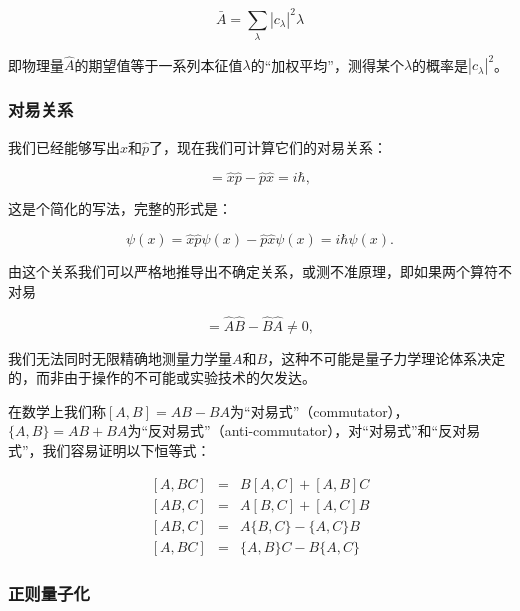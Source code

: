 \begin{equation}
\bar A = \sum\limits_{\lambda} |c_{\lambda}|^2 \lambda
\end{equation}

即物理量$\hat A$的期望值等于一系列本征值$\lambda$的“加权平均”，测得某个$\lambda$的概率是$|c_{\lambda}|^2$。

\subsubsection{对易关系}

我们已经能够写出$\hat x$和$\hat p$了，现在我们可计算它们的对易关系：

\begin{equation}
[\hat x, \hat p] = \hat x \hat p - \hat p \hat x = i \hbar,
\end{equation}

这是个简化的写法，完整的形式是：

\begin{equation}
[\hat x, \hat p]\psi(x) = \hat x \hat p \psi(x) - \hat p \hat x
\psi(x)= i \hbar \psi(x).
\end{equation}

由这个关系我们可以严格地推导出不确定关系，或测不准原理，即如果两个算符不对易

\begin{equation}
[\hat A, \hat B] =\hat A \hat B - \hat B \hat A  \neq 0 ,
\end{equation}

我们无法同时无限精确地测量力学量$A$和$B$，这种不可能是量子力学理论体系决定的，而非由于操作的不可能或实验技术的欠发达。

在数学上我们称$[A, B]=AB-BA$为“对易式”（commutator），$\{ A,B \} = AB + BA$为“反对易式”（anti-commutator），对“对易式”和“反对易式”，我们容易证明以下恒等式：

\begin{eqnarray}
  \left[A, BC \right] &=& B \left[A, C \right] + \left[A,B \right]C \\
  \left[AB, C \right] &=& A \left[B,C \right] + \left[A, C \right]
  B \\
  \left[AB,C \right]  &=& A \{ B,C \}- \{ A, C \} B \\
  \left[A, BC \right] &=& \{A , B \} C- B \{A , C \}
\end{eqnarray}

\subsubsection{正则量子化}

